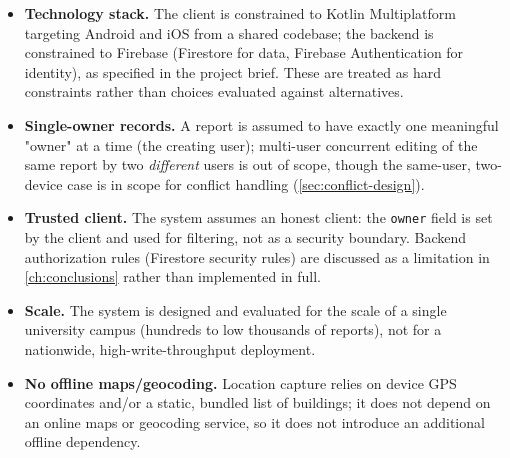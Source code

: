 \begin{itemize}
  \item \textbf{Technology stack.} The client is constrained to Kotlin
  Multiplatform targeting Android and iOS from a shared codebase; the
  backend is constrained to Firebase (Firestore for data, Firebase
  Authentication for identity), as specified in the project brief. These
  are treated as hard constraints rather than choices evaluated against
  alternatives.
  \item \textbf{Single-owner records.} A report is assumed to have exactly
  one meaningful "owner" at a time (the creating user); multi-user
  concurrent editing of the same report by two \emph{different} users is
  out of scope, though the same-user, two-device case is in scope for
  conflict handling (\cref{sec:conflict-design}).
  \item \textbf{Trusted client.} The system assumes an honest client: the
  \texttt{owner} field is set by the client and used for filtering, not as
  a security boundary. Backend authorization rules (Firestore security
  rules) are discussed as a limitation in \cref{ch:conclusions} rather than
  implemented in full.
  \item \textbf{Scale.} The system is designed and evaluated for the scale
  of a single university campus (hundreds to low thousands of reports),
  not for a nationwide, high-write-throughput deployment.
  \item \textbf{No offline maps/geocoding.} Location capture relies on
  device GPS coordinates and/or a static, bundled list of buildings; it
  does not depend on an online maps or geocoding service, so it does not
  introduce an additional offline dependency.
\end{itemize}
